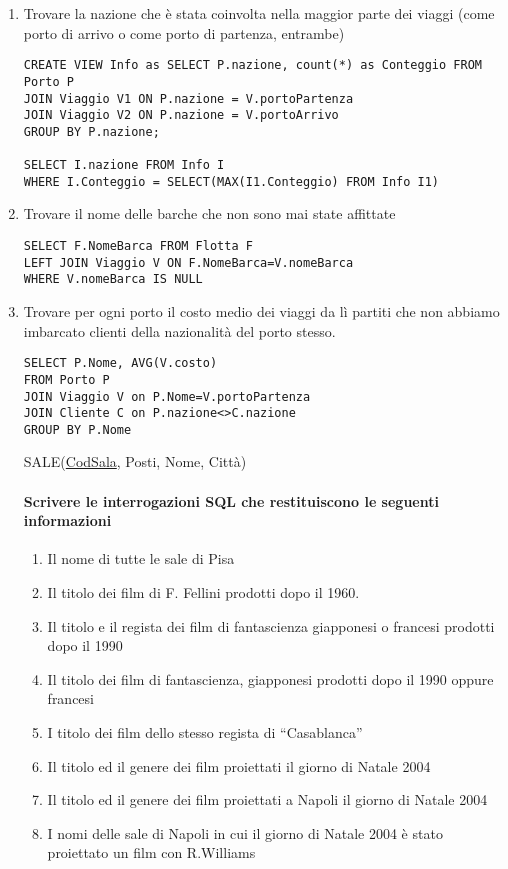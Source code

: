 \documentclass[a4paper]{article}
\begin{document}
\begin{enumerate}
\item Trovare la nazione che è stata coinvolta nella maggior parte dei viaggi (come porto di arrivo o come porto di partenza, entrambe)
\begin{verbatim}
CREATE VIEW Info as SELECT P.nazione, count(*) as Conteggio FROM Porto P
JOIN Viaggio V1 ON P.nazione = V.portoPartenza
JOIN Viaggio V2 ON P.nazione = V.portoArrivo
GROUP BY P.nazione;

SELECT I.nazione FROM Info I
WHERE I.Conteggio = SELECT(MAX(I1.Conteggio) FROM Info I1)
\end{verbatim}
\item Trovare il nome delle barche che non sono mai state affittate
\begin{verbatim}
SELECT F.NomeBarca FROM Flotta F
LEFT JOIN Viaggio V ON F.NomeBarca=V.nomeBarca
WHERE V.nomeBarca IS NULL
\end{verbatim}
\item Trovare per ogni porto il costo medio dei viaggi da lì partiti che non abbiamo imbarcato clienti della nazionalità del porto stesso.
\begin{verbatim}
SELECT P.Nome, AVG(V.costo)
FROM Porto P
JOIN Viaggio V on P.Nome=V.portoPartenza
JOIN Cliente C on P.nazione<>C.nazione
GROUP BY P.Nome
\end{verbatim}
SALE(\underline{CodSala}, Posti, Nome, Città)
%
\paragraph{Scrivere le interrogazioni SQL che restituiscono le seguenti informazioni}
\begin{enumerate}
\item Il nome di tutte le sale di Pisa
\item Il titolo dei film di F. Fellini prodotti dopo il 1960.
\item Il titolo e il regista dei film di fantascienza giapponesi o francesi prodotti dopo il 1990
\item Il titolo dei film di fantascienza, giapponesi prodotti dopo il 1990 oppure francesi
\item I titolo dei film dello stesso regista di “Casablanca”
\item Il titolo ed  il genere dei film proiettati il giorno di Natale 2004
\item  Il titolo ed  il genere dei film proiettati a Napoli il giorno di Natale 2004
\item  I nomi delle sale di Napoli in cui  il giorno di Natale 2004 è stato proiettato un film con R.Williams
\end{enumerate}


\end{enumerate}
\end{document}
